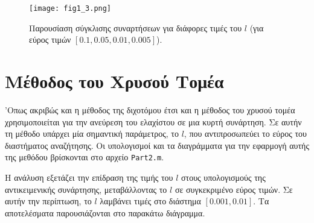 \documentclass[a4paper,12pt]{report}
\newcommand{\en}{\selectlanguage{english}}
\newcommand{\gr}{\selectlanguage{greek}}
\begin{document}
\begin{figure}[ht!]
    \centering
    \texttt{[image: fig1\_3.png]} 
    \caption{Παρουσίαση σύγκλισης συναρτήσεων για διάφορες τιμές του \( l \) (για εύρος τιμών \([0.1, 0.05, 0.01, 0.005]\)).}
\end{figure}

\chapter{Μέθοδος του Χρυσού Τομέα}
'Οπως ακριβώς και η μέθοδος της διχοτόμου έτσι και η μέθοδος του χρυσού τομέα χρησιμοποιείται για την ανεύρεση του ελαχίστου σε μια κυρτή συνάρτηση. Σε αυτήν τη μέθοδο υπάρχει μία σημαντική παράμετρος, το \( l \), που αντιπροσωπεύει το εύρος του διαστήματος αναζήτησης. Οι υπολογισμοί και τα διαγράμματα για την εφαρμογή αυτής της μεθόδου βρίσκονται στο αρχείο \en \texttt{Part2.m}\gr.

\vspace{0.3cm}

\hspace{-0.6cm}Η ανάλυση εξετάζει την επίδραση της τιμής του \( l \) στους υπολογισμούς της αντικειμενικής συνάρτησης, μεταβάλλοντας το \( l \) σε συγκεκριμένο εύρος τιμών. Σε αυτήν την περίπτωση, το \( l \) λαμβάνει τιμές στο διάστημα \([0.001, 0.01]\). Τα αποτελέσματα παρουσιάζονται στο παρακάτω διάγραμμα.
\end{document}
